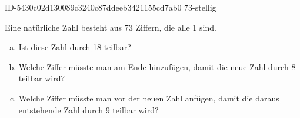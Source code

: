 \begin{exercise}
      {ID-5430c02d130089c3240c87ddeeb3421155cd7ab0}
      {73-stellig}
  \ifproblem\problem\par
    Eine natürliche Zahl besteht aus 73 Ziffern, die alle 1 sind.
    \begin{enumerate}[a)]
      \item Ist diese Zahl durch 18 teilbar?
      \item Welche Ziffer müsste man am Ende hinzufügen, damit die
            neue Zahl durch 8 teilbar wird?
      \item Welche Ziffer müsste man vor der neuen Zahl anfügen,
            damit die daraus entstehende Zahl durch 9 teilbar wird?
    \end{enumerate}
  \fi
\end{exercise}
